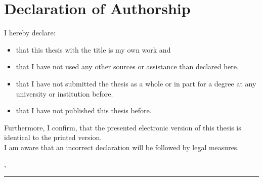 
\clearpage

\chapter*{Declaration of Authorship}
\thispagestyle{scrheadings}

I hereby declare:

\begin{itemize}
	\item that this thesis with the title \textit{\thetitle} is my own work and
	\item that I have not used any other sources or assistance than declared here.
	\item that I have not submitted the thesis as a whole or in part for a degree at any university
		or institution before.
	\item that I have not published this thesis before.
\end{itemize}

Furthermore, I confirm, that the presented electronic version of this thesis is identical to the printed version.\\
I am aware that an incorrect declaration will be followed by legal measures.

\vspace{3em}

\theplace, \thedate
\vspace{4em}

\rule{6cm}{0.4pt}\\
\theauthor
